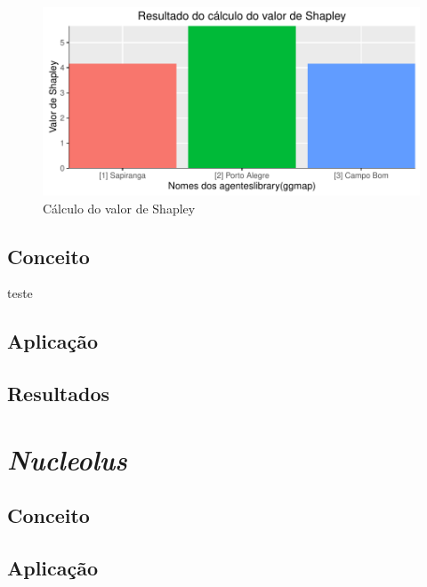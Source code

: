 \documentclass[
	article,			        %
	11pt,				          %
	oneside,			        %
	a4paper,			        %
	english,			        %
	brazil,				        %
	sumario=tradicional
]{abntex2}\usepackage[]{graphicx}\usepackage[]{color}
\makeatletter
\def\maxwidth{ %
  \ifdim\Gin@nat@width>\linewidth
    \linewidth
  \else
    \Gin@nat@width
  \fi
}
\newenvironment{knitrout}{}{} %
\makeatother
\begin{document}
\begin{knitrout}
\color{fgcolor}\begin{figure}[h]

{\centering \includegraphics[width=\maxwidth]{figure/unnamed-chunk-5-1} 

}

\caption[Cálculo do valor de Shapley]{Cálculo do valor de Shapley}\label{fig:unnamed-chunk-5}
\end{figure}


\end{knitrout}

\subsection{Conceito}

teste

\subsection{Aplicação}

\subsection{Resultados}

\section{\emph{Nucleolus}}

\subsection{Conceito}

\subsection{Aplicação}
\end{document}
